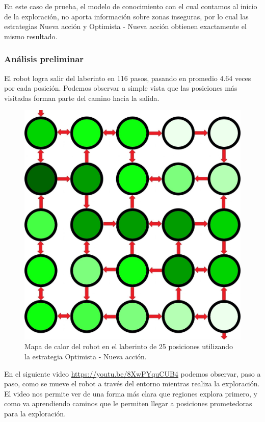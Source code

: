 En este caso de prueba, el modelo de conocimiento con el cual contamos al inicio de la exploración, no aporta información sobre
zonas inseguras, por lo cual las estrategias Nueva acción y Optimista - Nueva acción obtienen exactamente el mismo resultado.

\subsubsection{Análisis preliminar}

El robot logra salir del laberinto en 116 pasos, pasando en promedio 4.64 veces por cada posición. 
Podemos observar a simple vista que las posiciones más visitadas forman parte del camino hacia la salida.

\begin{figure}[H]
	\centering
		\includegraphics[scale=0.2]{Imagenes/Laberintos/25_calor.jpg}
	\caption{Mapa de calor del robot en el laberinto de 25 posiciones utilizando la estrategia Optimista - Nueva acción.}
	\label{fig:25_calor}
\end{figure}

En el siguiente video \url{https://youtu.be/8XwPYquCUB4} podemos observar, paso a paso, como se mueve el
robot a través del entorno mientras realiza la exploración. El video nos permite ver de una forma más
clara que regiones explora primero, y como va aprendiendo caminos que le permiten llegar a posiciones prometedoras
para la exploración.

